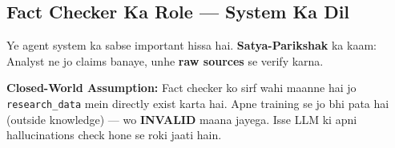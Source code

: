\documentclass[11pt, a4paper]{article}
\begin{document}
\subsection{Fact Checker Ka Role --- System Ka Dil}

\begin{storybox}
Ye agent system ka sabse important hissa hai. \textbf{Satya-Parikshak} ka kaam: Analyst ne jo claims banaye, unhe \textbf{raw sources} se verify karna.

\textbf{Closed-World Assumption:} Fact checker ko sirf wahi maanne hai jo \texttt{research\_data} mein directly exist karta hai. Apne training se jo bhi pata hai (outside knowledge) --- wo \textbf{INVALID} maana jayega. Isse LLM ki apni hallucinations check hone se roki jaati hain.
\end{storybox}
\end{document}
